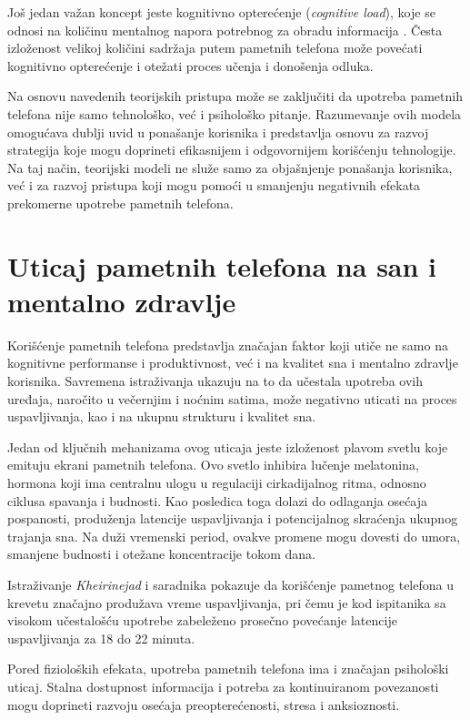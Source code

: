\documentclass{article}
\begin{document}
Još jedan važan koncept jeste kognitivno opterećenje (\textit{cognitive load}), koje se odnosi na količinu mentalnog napora potrebnog za obradu informacija \cite{Sweller1988}. Česta izloženost velikoj količini sadržaja putem pametnih telefona može povećati kognitivno opterećenje i otežati proces učenja i donošenja odluka.

Na osnovu navedenih teorijskih pristupa može se zaključiti da upotreba pametnih telefona nije samo tehnološko, već i psihološko pitanje. Razumevanje ovih modela omogućava dublji uvid u ponašanje korisnika i predstavlja osnovu za razvoj strategija koje mogu doprineti efikasnijem i odgovornijem korišćenju tehnologije. Na taj način, teorijski modeli ne služe samo za objašnjenje ponašanja korisnika, već i za razvoj pristupa koji mogu pomoći u smanjenju negativnih efekata prekomerne upotrebe pametnih telefona.


\section{Uticaj pametnih telefona na san i mentalno zdravlje}

Korišćenje pametnih telefona predstavlja značajan faktor koji utiče ne samo na kognitivne performanse i produktivnost, već i na kvalitet sna i mentalno zdravlje korisnika. Savremena istraživanja ukazuju na to da učestala upotreba ovih uređaja, naročito u večernjim i noćnim satima, može negativno uticati na proces uspavljivanja, kao i na ukupnu strukturu i kvalitet sna.

Jedan od ključnih mehanizama ovog uticaja jeste izloženost plavom svetlu koje emituju ekrani pametnih telefona. Ovo svetlo inhibira lučenje melatonina, hormona koji ima centralnu ulogu u regulaciji cirkadijalnog ritma, odnosno ciklusa spavanja i budnosti. Kao posledica toga dolazi do odlaganja osećaja pospanosti, produženja latencije uspavljivanja i potencijalnog skraćenja ukupnog trajanja sna. Na duži vremenski period, ovakve promene mogu dovesti do umora, smanjene budnosti i otežane koncentracije tokom dana.

Istraživanje \textit{Kheirinejad} i saradnika \cite{Kheirinejad2022} pokazuje da korišćenje pametnog telefona u krevetu značajno produžava vreme uspavljivanja, pri čemu je kod ispitanika sa visokom učestalošću upotrebe zabeleženo prosečno povećanje latencije uspavljivanja za 18 do 22 minuta.

Pored fizioloških efekata, upotreba pametnih telefona ima i značajan psihološki uticaj. Stalna dostupnost informacija i potreba za kontinuiranom povezanosti mogu doprineti razvoju osećaja preopterećenosti, stresa i anksioznosti.
\end{document}
